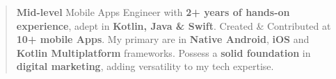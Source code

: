 \documentclass[10pt,a4paper,ragged2e,withhyper]{altacv}
\begin{document}


%


    \makecvheader



    \begin{quote}

        \textbf{Mid-level}  Mobile Apps Engineer with \textbf{2+ years of hands-on experience},
        adept in \textbf{Kotlin, Java \& Swift}.
        Created \& Contributed at \textbf{10+ mobile Apps}.
        My primary are in \textbf{Native Android}, \textbf{iOS} and \textbf{Kotlin Multiplatform} frameworks.
        Possess a \textbf{solid foundation} in \textbf{digital marketing}, adding versatility to my tech expertise.
    \end{quote}

\end{document}
